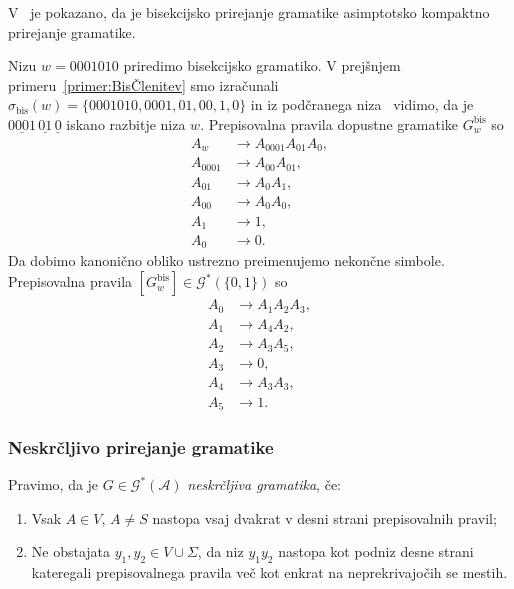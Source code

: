\documentclass[fin1, tisk]{fmfdelo}
\newcommand{\A}{\mathcal{A}}
\newcommand{\G}{\mathcal{G}}
\theoremstyle{definition}
\begin{document}
V~\cite{KiefferYangEt2000} je pokazano, da je bisekcijsko prirejanje gramatike asimptotsko kompaktno 
prirejanje gramatike.

\begin{primer}
    Nizu $w = 0001010$ priredimo bisekcijsko gramatiko.  V prejšnjem 
    primeru~\ref{primer:BisČlenitev} smo izračunali 
    $\sigma_{\text{bis}}(w) = \{ 0001010, 0001, 01, 00, 1, 0 \}$ in iz podčranega 
    niza~ vidimo, da je $\underline{0001} \, \underline{01} \, \underline{0}$
    iskano razbitje niza $w$. Prepisovalna pravila dopustne gramatike $G^\text{bis}_w$ so
    \begin{align*}
        A_w &\rightarrow A_{0001}A_{01}A_{0}, \\
        A_{0001} &\rightarrow A_{00}A_{01}, \\
        A_{01} &\rightarrow A_{0}A_{1}, \\
        A_{00} &\rightarrow A_{0}A_{0}, \\
        A_{1} &\rightarrow 1, \\
        A_{0} &\rightarrow 0.
    \end{align*}
    Da dobimo kanonično obliko ustrezno preimenujemo nekončne simbole.
    Prepisovalna pravila $[G^\text{bis}_w] \in \G^*(\{ 0, 1 \})$ so
    \begin{align*}
        A_0 &\rightarrow A_1A_2A_3, \\
        A_1 &\rightarrow A_4A_2, \\
        A_2 &\rightarrow A_3A_5, \\
        A_3 &\rightarrow 0, \\
        A_4 &\rightarrow A_3A_3, \\
        A_5 &\rightarrow 1.
    \end{align*}
\end{primer}

\subsubsection{Neskrčljivo prirejanje gramatike}

\begin{definicija}
    Pravimo, da je $G \in \G^*(\A)$ \emph{neskrčljiva gramatika}, če:
    \begin{enumerate}
        \item Vsak $A \in V$, $A \neq S$ nastopa vsaj dvakrat v desni strani prepisovalnih pravil;
        \item Ne obstajata $y_1,y_2 \in V \cup \Sigma$, da niz $y_1y_2$ nastopa kot podniz desne 
        strani kateregali prepisovalnega pravila več kot enkrat na neprekrivajočih se mestih. 
    \end{enumerate}
\end{definicija}
\end{document}
